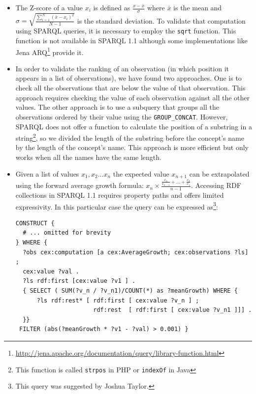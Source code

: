 \documentclass{acm_proc_article-sp}
\newcommand{\footnoteUrl}[1]{\footnote{\url{#1}}}
\begin{document}
\begin{itemize} 

\item The Z-score of a value $x_i$ is defined as $\frac{x - \bar{x}}{\sigma}$
where $\bar{x}$ is the mean and $\sigma=\sqrt{\frac{\sum_{i=1}^{N}(\bar{x}-x_i)^2}{N -
1}}$ is the standard deviation. To validate that computation using SPARQL
queries, it is necessary to employ the \lstinline|sqrt| function. 
This function is not available in SPARQL 1.1 although some implementations 
 like Jena
 ARQ\footnoteUrl{http://jena.apache.org/documentation/query/library-function.html} 
 provide it.

\item In order to validate the ranking of an observation (in which position it
appears in a list of observations), we have found two approaches. One is to
check all the observations that are below the value of that observation. 
This approach requires checking the value of each observation against all the
other values. The other approach is to use a subquery that groups all the
observations ordered by their value using the \lstinline|GROUP_CONCAT|. 
However, SPARQL does not offer a function to calculate the position
of a substring in a string\footnote{This function is called \lstinline|strpos| in PHP or \lstinline|indexOf| in Java}, 
so we divided the length of the substring before the concept's 
name by the length of the concept's name. 
This approach is more efficient but only works when all the names have
the same length.

\item Given a list of values $x_1,x_2\ldots{}x_n$ the expected value
$x_{n+1}$ can be extrapolated using the forward average growth formula: 
$x_n\times{\frac{\frac{x_{n}}{x_{n-1}}+\ldots{}+\frac{x_{2}}{x_1}}{n-1}}$. 
Accessing RDF collections in SPARQL 1.1 requires property paths 
and offers limited expressivity. In this particular case 
the query can be expressed 
as\footnote{This query was suggested by Joshua Taylor.}:

\begin{lstlisting}[style=SPARQL]
CONSTRUCT {
  # ... omitted for brevity
} WHERE { 
  ?obs cex:computation [a cex:AverageGrowth; cex:observations ?ls] ;
  cex:value ?val .
  ?ls rdf:first [cex:value ?v1 ] .
  { SELECT ( SUM(?v_n / ?v_n1)/COUNT(*) as ?meanGrowth) WHERE {
      ?ls rdf:rest* [ rdf:first [ cex:value ?v_n ] ; 
                      rdf:rest  [ rdf:first [ cex:value ?v_n1 ]]] .
  }} 
 FILTER (abs(?meanGrowth * ?v1 - ?val) > 0.001) }
\end{lstlisting}

\end{itemize}
\end{document}
